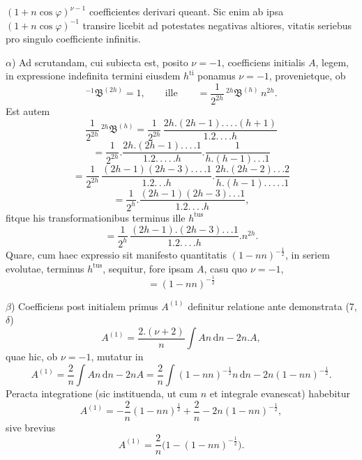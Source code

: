 $(1+n\cos\varphi)^{\nu-1}$ coefficientes derivari queant. Sic enim ab ipsa $(1+n\cos\varphi)^{-1}$ transire licebit ad potestates negativas altiores, vitatis seriebus pro singulo coefficiente infinitis.

$\alpha$) Ad scrutandam, cui subiecta est, posito $\nu=-1$, coefficiens initialis $A$, legem, in expressione indefinita termini eiusdem $h^{\text{ti}}$ ponamus $\nu=-1$, provenietque, ob
\[
{}^{-1}\mathfrak{B}^{(2h)} = 1, \qquad \text{ille} \qquad = \frac{1}{2^{2h}}\,{}^{2h}\mathfrak{B}^{(h)}\,n^{2h}.
\]
Est autem
\[
\frac{1}{2^{2h}}\,{}^{2h}\mathfrak{B}^{(h)} = \frac{1}{2^{2h}}\,\frac{2h.(2h-1).\,.\,.\,.(h+1)}{1.2.\,.\,.\,. h}
\]
\[
= \frac{1}{2^{2h}} . \frac{2h.(2h-1).\,.\,.\,. 1}{1.2.\,.\,.\,.\,. h} . \frac{1}{h.(h-1).\,.\,. 1}
\]
\[
= \frac{1}{2^{2h}}\,\frac{(2h-1)(2h-3).\,.\,.\,. 1}{1.2.\,.\,. h} . \frac{2h.(2h-2).\,.\,. 2}{h.(h-1).\,.\,.\,.\,. 1}
\]
\[
= \frac{1}{2^{h}} . \frac{(2h-1)(2h-3).\,.\,. 1}{1.2.\,.\,.\,. h},
\]
fitque his transformationibus terminus ille $h^{\text{tus}}$
\[
= \frac{1}{2^{h}}\,\frac{(2h-1).(2h-3).\,.\,. 1}{1.2.\,.\,.\,. h} .  n^{2h}.
\]
Quare, cum haec expressio sit manifesto quantitatis $(1-nn)^{-\frac{1}{2}}$, in seriem evolutae, terminus $h^{\text{tus}}$, sequitur, fore ipsam $A$, casu quo $\nu=-1$,
\[
= (1-nn)^{-\frac{1}{2}}
\]
\par\noindent\hspace*{\parindent}$\beta$) Coefficiens post initialem primus $A^{(1)}$ definitur relatione ante demonstrata (7, $\delta$)
\[
A^{(1)} = \frac{2.(\nu+2)}{n}\int An\,\mathrm{d}n - 2n.A,
\]
quae hic, ob $\nu=-1$, mutatur in
\[
A^{(1)} = \frac{2}{n}\int An\,\mathrm{d}n - 2nA = \frac{2}{n}\int(1-nn)^{-\frac{1}{2}}n\,\mathrm{d}n - 2n(1-nn)^{-\frac{1}{2}}.
\]
Peracta integratione (sic instituenda, ut cum $n$ et integrale evanescat) habebitur
\[
A^{(1)} = -\frac{2}{n}(1-nn)^{\frac{1}{2}} + \frac{2}{n} - 2n(1-nn)^{-\frac{1}{2}},
\]
sive brevius
\[
A^{(1)} = \frac{2}{n}\bigl(1-(1-nn)^{-\frac{1}{2}}\bigr).
\]

